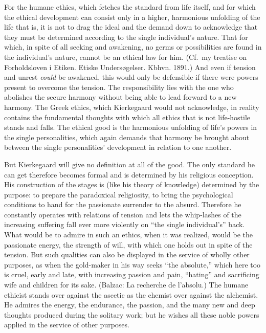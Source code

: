 \documentclass[12pt,a4paper]{book}
\newcommand{\opage}[1]{\marginnote{\footnotesize\textit{[#1]}}}
\begin{document}
For the humane ethics, which fetches the standard from life itself, and
for which the ethical development can consist only in a higher,
harmonious unfolding of the life that is, it is not to drag the ideal
and the demand down to acknowledge that they must be determined
according to the single individual's nature. That for which, in spite
of all seeking and awakening, no germs or possibilities are found in the
individual's nature, cannot be an ethical law for him. (Cf.\ my treatise
on Forholdsloven i Etiken. Etiske Undersøgelser. Kbhvn. 1891.) And even
if tension and unrest \textit{could} be awakened, this would only be
defensible if there were powers present to overcome the tension. The
responsibility lies with the one who abolishes the secure harmony
without being able to lead forward to a new harmony. The Greek ethics,
which Kierkegaard would not acknowledge, in reality contains the
fundamental thoughts with which all ethics that is not life-hostile
stands and falls. The ethical good is the harmonious unfolding of life's
powers in the single personalities, which again demands that harmony be
brought about between the single personalities' development in relation
to one another.

But Kierkegaard will give no definition at all of the good. The only
standard he can get therefore becomes formal and is determined by his
religious conception. His construction of the stages is (like his
theory of knowledge) determined by the purpose: to prepare the
paradoxical religiosity, to bring the psychological
\opage{124}conditions to hand for the passionate surrender to the absurd.
Therefore he constantly operates with relations of tension and lets the
whip-lashes of the increasing suffering fall ever more violently on
``the single individual's'' back. What would be to admire in such an
ethics, when it was realized, would be the passionate energy, the
strength of will, with which one holds out in spite of the tension. But
such qualities can also be displayed in the service of wholly other
purposes, as when the gold-maker in his way seeks ``the absolute,''
which here too is cruel, early and late, with increasing passion and
pain, ``hating'' and sacrificing wife and children for its sake.
(Balzac: La recherche de l'absolu.) The humane ethicist stands over
against the ascetic as the chemist over against the alchemist. He admires
the energy, the endurance, the passion, and the many new and deep
thoughts produced during the solitary work; but he wishes all these
noble powers applied in the service of other purposes.
\end{document}
